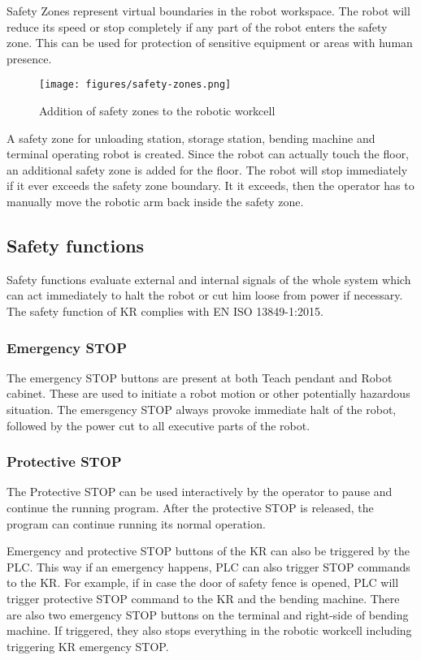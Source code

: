 Safety Zones represent virtual boundaries in the robot workspace. The robot will reduce its speed or stop
completely if any part of the robot enters the safety zone. This can be used for protection of sensitive
equipment or areas with human presence. \cite[page 96]{kassow-software-manual}


\begin{figure}[h]
    \centering
    \texttt{[image: figures/safety-zones.png]}
    \caption{Addition of safety zones to the robotic workcell}
    \label{fig:safety-zones}
\end{figure}

A safety zone for unloading station, storage station, bending machine and terminal operating
robot is created. Since the
robot can actually touch the floor, an additional safety zone is added for the floor. 
The robot will stop immediately if it ever exceeds the safety zone boundary. It it exceeds, 
then the operator
has to manually move the robotic arm back inside the safety zone. 


\subsection{Safety functions}
\label{subsec:safety-functions}
Safety functions evaluate external and internal signals of the whole system which can act immediately to
halt the robot or cut him loose from power if necessary. 
The safety function of KR complies with EN ISO 13849-1:2015.
\cite[page 13]{kassow-software-manual}

    \subsubsection{Emergency STOP}
    The emergency STOP buttons are present at both Teach pendant and Robot cabinet. These are used to
    initiate a robot motion or other potentially hazardous situation.
    The emersgency STOP always provoke immediate halt of the robot, followed by the power cut to all
    executive parts of the robot.

    \subsubsection{Protective STOP}
    The Protective STOP can be used interactively by the operator to pause and continue the running program.
    After the protective STOP is released, the program can continue running its normal operation.

\vspace{1\baselineskip}
Emergency and protective STOP buttons of the KR can also be triggered by the PLC. This way
if an emergency happens, PLC can also trigger STOP commands to the KR. For example, if in
case the door of safety fence is opened, PLC will trigger protective STOP command to the 
KR and the bending machine.
There are also two emergency STOP buttons on the terminal and right-side of bending machine. If triggered,
they also stops everything in the robotic workcell including triggering KR emergency STOP.
